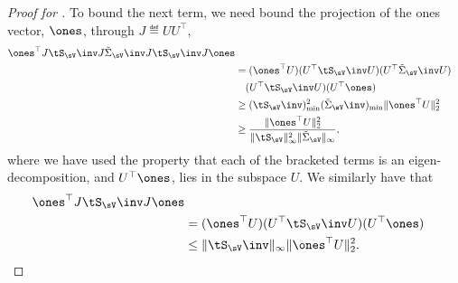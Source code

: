 \begin{proof}[Proof for ]
  To bound the next term, we need bound the projection of the ones
  vector, $\ones$, through $J \eqdef U U^\top$,
  \begin{align*}
      \ones^\top J \tS_\sV\inv J \tilde\Sigma_\sV\inv J \tS_\sV\inv J \ones \\
      &=
      (\ones^\top U) (U^\top \tS_\sV\inv U) (U^\top \tilde\Sigma_\sV\inv U) \\
      &\quad (U^\top \tS_\sV\inv U) (U^\top \ones)  \\
      &\ge 
      (\tS_\sV\inv)^2_{\min}
      (\tilde\Sigma_\sV\inv)_{\min}
      \|\ones^\top U\|^2_2 \\
      &\ge 
      \frac{\|\ones^\top U\|^2_2}{\|\tS_\sV\|^2_\infty \|\tilde\Sigma_\sV\|_\infty},
  \end{align*}
  where we have used the property that each of the bracketed terms is an
  eigen-decomposition, and $U^\top \ones$, lies in the subspace $U$.
  We similarly have that
  \begin{align*}
      \ones^\top J \tS_\sV\inv J \ones \\
      &=
      (\ones^\top U) (U^\top \tS_\sV\inv U) (U^\top \ones) \\
      &\le 
      \|\tS_\sV\inv\|_{\infty}
      \|\ones^\top U\|^2_2.
  \end{align*}


\end{proof}
